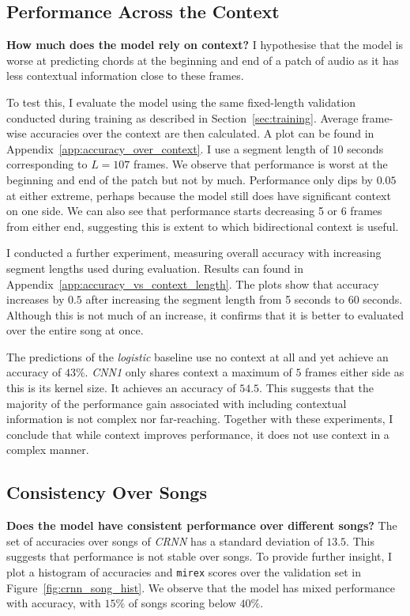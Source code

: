 \subsection{Performance Across the Context}\label{sec:crnn_performance_across_context}

\textbf{How much does the model rely on context?} I hypothesise that the model is worse at predicting chords at the beginning and end of a patch of audio as it has less contextual information close to these frames. 

To test this, I evaluate the model using the same fixed-length validation conducted during training as described in Section~\ref{sec:training}. Average frame-wise accuracies over the context are then calculated. A plot can be found in Appendix~\ref{app:accuracy_over_context}. I use a segment length of $10$ seconds corresponding to $L=107$ frames. We observe that performance is worst at the beginning and end of the patch but not by much. Performance only dips by $0.05$ at either extreme, perhaps because the model still does have significant context on one side. We can also see that performance starts decreasing 5 or 6 frames from either end, suggesting this is extent to which bidirectional context is useful.

I conducted a further experiment, measuring overall accuracy with increasing segment lengths used during evaluation. Results can found in Appendix~\ref{app:accuracy_vs_context_length}. The plots show that accuracy increases by $0.5$ after increasing the segment length from 5 seconds to 60 seconds. Although this is not much of an increase, it confirms that it is better to evaluated over the entire song at once.

The predictions of the \emph{logistic} baseline use no context at all and yet achieve an accuracy of $43\%$. \emph{CNN1} only shares context a maximum of $5$ frames either side as this is its kernel size. It achieves an accuracy of $54.5$. This suggests that the majority of the performance gain associated with including contextual information is not complex nor far-reaching. Together with these experiments, I conclude that while context improves performance, it does not use context in a complex manner. 

\subsection{Consistency Over Songs}

\textbf{Does the model have consistent performance over different songs?} The set of accuracies over songs of \emph{CRNN} has a standard deviation of $13.5$. This suggests that performance is not stable over songs. To provide further insight, I plot a histogram of accuracies and \texttt{mirex} scores over the validation set in Figure~\ref{fig:crnn_song_hist}. We observe that the model has mixed performance with accuracy, with $15\%$ of songs scoring below $40\%$.  


